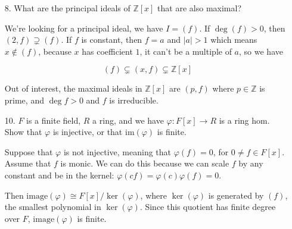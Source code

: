 \documentclass[12pt]{article}
\def\image{\text{image}}
\def\im{\text{im}}
\def\Z{{\mathbb Z}}
\theoremstyle{remark}
\theoremstyle{remark}
\theoremstyle{remark}
\theoremstyle{remark}
\theoremstyle{remark}
\begin{document}
\begin{enumerate}
  \item[8.] What are the principal ideals of $\Z[x]$ that are also maximal?

    We're looking for a principal ideal, we have $I = (f)$. If $\deg(f) > 0$,
    then $(2, f) \supsetneq (f)$. If $f$ is constant, then $f = a$ and $|a| > 1$
    which means $x \not\in (f)$, because $x$ has coefficient $1$, it can't be a
    multiple of $a$, so we have

    \[
      (f) \subsetneq (x, f) \subsetneq \Z[x]
    \]

    Out of interest, the maximal ideals in $\Z[x]$ are $(p, f)$ where $p \in \Z$
    is prime, and $\deg f > 0$ and $f$ is irreducible.

  \item[10.] $F$ is a finite field, $R$ a ring, and we have $\varphi: F[x] \to
    R$ is a ring hom. Show that $\varphi$ is injective, or that $\im(\varphi)$
    is finite.

    Suppose that $\varphi$ is not injective, meaning that $\varphi(f) = 0$, for
    $0 \ne f \in F[x]$. Assume that $f$ is monic. We can do this because we can
    scale $f$ by any constant and be in the kernel: $\varphi(cf) =
    \varphi(c)\varphi(f) = 0$.

    Then $\image(\varphi) \cong F[x] / \ker(\varphi)$, where $\ker(\varphi)$ is
    generated by $(f)$, the smallest polynomial in $\ker(\varphi)$. Since this
    quotient has finite degree over $F$, $\image(\varphi)$ is finite.
\end{enumerate}
\end{document}
